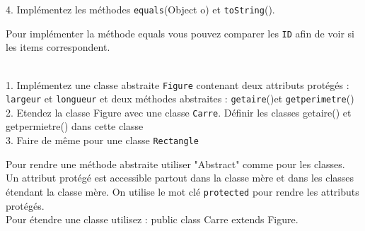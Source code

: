 \begin{Exercice}[10 minutes]
4. Implémentez les méthodes \lstinline{equals}(Object o) et \lstinline{toString}().

\begin{conseil}
Pour implémenter la méthode equals vous pouvez comparer les \lstinline{ID} afin de voir si les items correspondent.
\end{conseil}

%              
\end{Exercice}


\begin{Exercice}[10 minutes]\\
1. Implémentez une classe abstraite \lstinline{Figure} contenant deux attributs protégés : \lstinline{largeur} et \lstinline{longueur} et deux méthodes abstraites : \lstinline{getaire}()et \lstinline{getperimetre}()\\
2. Etendez la classe Figure avec une classe \lstinline{Carre}. Définir les classes getaire() et getpermietre() dans cette classe\\
3. Faire de même pour une classe \lstinline{Rectangle}\\

\begin{conseil}
    Pour rendre une méthode abstraite utiliser "Abstract" comme pour les classes.\\
    Un attribut protégé est accessible partout dans la classe mère et dans les classes étendant la classe mère. On utilise le mot clé \lstinline{protected} pour rendre les attributs protégés. \\
    Pour étendre une classe utilisez : public class Carre extends Figure. 
\end{conseil}



    \begin{solution}
 
    \end{solution}
\end{Exercice}

